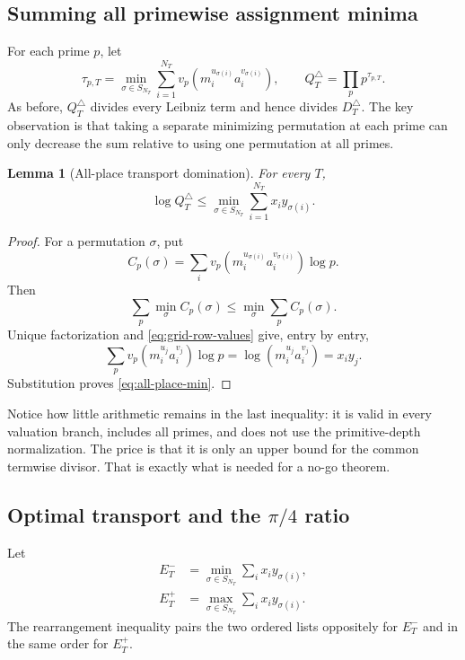\documentclass[11pt,oneside]{article}
\newtheorem{lemma}[theorem]{Lemma}
\theoremstyle{definition}
\theoremstyle{remark}
\begin{document}
\subsection{Summing all primewise assignment minima}

For each prime $p$, let
\begin{equation}\label{eq:grid-tau}
 \tau_{p,T}
 =\min_{\sigma\in S_{N_T}}
   \sum_{i=1}^{N_T}
   v_p\!\left(m_i^{u_{\sigma(i)}}a_i^{v_{\sigma(i)}}\right),
 \qquad
 Q_T^{\triangle}=\prod_p p^{\tau_{p,T}}.
\end{equation}
As before, $Q_T^{\triangle}$ divides every Leibniz term and hence divides
$D_T^{\triangle}$.  The key observation is that taking a separate minimizing permutation at
each prime can only decrease the sum relative to using one permutation at all primes.

\begin{lemma}[All-place transport domination]\label{lem:all-place-transport}
For every $T$,
\begin{equation}\label{eq:all-place-min}
 \log Q_T^{\triangle}
 \le
 \min_{\sigma\in S_{N_T}}
 \sum_{i=1}^{N_T}x_i y_{\sigma(i)}.
\end{equation}
\end{lemma}

\begin{proof}
For a permutation $\sigma$, put
\[
 C_p(\sigma)=
 \sum_i v_p\!\left(m_i^{u_{\sigma(i)}}a_i^{v_{\sigma(i)}}\right)\log p.
\]
Then
\[
 \sum_p\min_\sigma C_p(\sigma)
 \le \min_\sigma\sum_p C_p(\sigma).
\]
Unique factorization and \eqref{eq:grid-row-values} give, entry by entry,
\[
 \sum_p v_p(m_i^{u_j}a_i^{v_j})\log p
 =\log(m_i^{u_j}a_i^{v_j})
 =x_i y_j.
\]
Substitution proves \eqref{eq:all-place-min}.
\end{proof}

Notice how little arithmetic remains in the last inequality: it is valid in every valuation
branch, includes all primes, and does not use the primitive-depth normalization.  The price is
that it is only an upper bound for the common termwise divisor.  That is exactly what is needed
for a no-go theorem.

\subsection{Optimal transport and the \texorpdfstring{$\pi/4$}{pi/4} ratio}

Let
\begin{align}
 E_T^-&=\min_{\sigma\in S_{N_T}}\sum_i x_i y_{\sigma(i)},
 \label{eq:grid-Eminus}\\
 E_T^+&=\max_{\sigma\in S_{N_T}}\sum_i x_i y_{\sigma(i)}.
 \label{eq:grid-Eplus}
\end{align}
The rearrangement inequality pairs the two ordered lists oppositely for $E_T^-$ and in the
same order for $E_T^+$.
\end{document}
